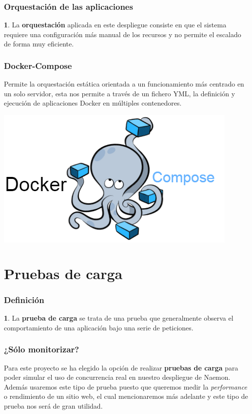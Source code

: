 \documentclass{beamer}
\theoremstyle{plain}
\theoremstyle{definition}
\newtheorem{defn}[thm]{}
\theoremstyle{plain}
\theoremstyle{definition}
\theoremstyle{remark}
\theoremstyle{definition}
\begin{document}
\begin{frame}
	\frametitle{Orquestación de las aplicaciones}
	\begin{defn}
		La \textbf{orquestación} aplicada en este despliegue consiste en que el sistema requiere una configuración más
		manual de los recursos y no permite el escalado de forma muy eficiente.
	\end{defn}
\end{frame}
\begin{frame}
	\frametitle{Docker-Compose}
	Permite la orquestación estática orientada a un funcionamiento más centrado en un solo servidor, esta nos permite a través de un fichero YML, la definición y ejecución de aplicaciones Docker en múltiples contenedores.
	
	\centering
	\includegraphics[scale=0.3]{imagenes/dockercompose.png}
\end{frame}
\section{Pruebas de carga} 
\begin{frame}
	\frametitle{Definición}
	\begin{defn}
	La \textbf{prueba de carga} se trata de una prueba que generalmente observa el comportamiento de una aplicación bajo una serie de peticiones.

\end{defn}
\end{frame}

\begin{frame}
	\frametitle{¿Sólo monitorizar?}
	Para este proyecto se ha elegido la opción de realizar \textbf{pruebas de carga} para poder simular el uso de concurrencia real en nuestro despliegue de Naemon.
	Además usaremos este tipo de prueba puesto que queremos medir la \textit{performance} o rendimiento de un sitio web, el cual mencionaremos más adelante y este tipo de prueba nos será de gran utilidad.
\end{frame}
\end{document}
